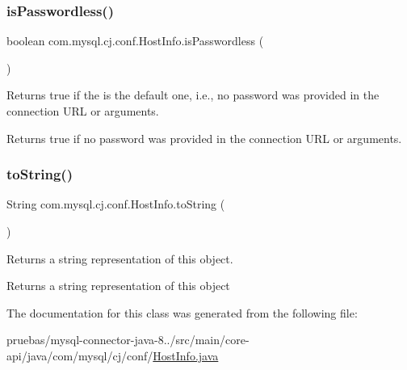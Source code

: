 \subsubsection{\texorpdfstring{is\+Passwordless()}{isPasswordless()}}
{\footnotesize\ttfamily boolean com.\+mysql.\+cj.\+conf.\+Host\+Info.\+is\+Passwordless (\begin{DoxyParamCaption}{ }\end{DoxyParamCaption})}

Returns true if the is the default one, i.\+e., no password was provided in the connection U\+RL or arguments.

\begin{DoxyReturn}{Returns}
true if no password was provided in the connection U\+RL or arguments. 
\end{DoxyReturn}
\mbox{\label{classcom_1_1mysql_1_1cj_1_1conf_1_1_host_info_ac3d7e44e2787c35c23b99127865233c0}} 
\subsubsection{\texorpdfstring{to\+String()}{toString()}}
{\footnotesize\ttfamily String com.\+mysql.\+cj.\+conf.\+Host\+Info.\+to\+String (\begin{DoxyParamCaption}{ }\end{DoxyParamCaption})}

Returns a string representation of this object.

\begin{DoxyReturn}{Returns}
a string representation of this object 
\end{DoxyReturn}


The documentation for this class was generated from the following file\+:\begin{DoxyCompactItemize}
\item 
pruebas/mysql-\/connector-\/java-\/8../src/main/core-\/api/java/com/mysql/cj/conf/\mbox{\hyperlink{_host_info_8java}{Host\+Info.\+java}}\end{DoxyCompactItemize}
